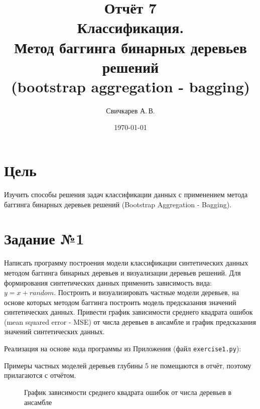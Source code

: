 \documentclass{article} %
\title{Отчёт 7\protect\\
    Классификация.\\
    Метод баггинга бинарных деревьев решений\\
    (bootstrap aggregation - bagging)} %
\author{Свичкарев А.\,В.} %
\date{\today} %
\begin{document}

\maketitle %

\section{Цель}
Изучить способы решения задач классификации данных с
применением метода баггинга бинарных деревьев решений
(Bootstrap Aggregation - Bagging).

\section{Задание №1}
Написать программу построения модели классификации синтетических данных
методом баггинга
бинарных деревьев и визуализации деревьев решений. Для
формирования синтетических данных применить зависимость вида: $y = x + random$.
Построить и визуализировать частные модели деревьев, на основе которых методом
баггинга построить модель предсказания значений синтетических данных. Привести
график зависимости среднего квадрата ошибок (mean squared error - MSE) от числа
деревьев в ансамбле и график предсказания значений синтетических данных.
\bigskip

Реализация на основе кода программы из Приложения (файл \verb$exercise1.py$):
\bigskip

\clearpage
Примеры частных моделей деревьев глубины 5 не помещаются в отчёт,
поэтому прилагаются с отчётом.

\begin{figure}[H]
    \centering
    \noindent{}
    \caption{График зависимости среднего квадрата ошибок от числа деревьев в ансамбле}
\end{figure}
\bigskip
\end{document}
